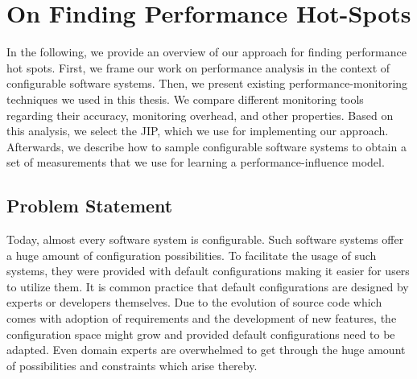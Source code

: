 \chapter{On Finding Performance Hot-Spots}
\label{chap:method}

In the following, we provide an overview of our approach for finding performance hot spots. First, we frame our work on performance analysis in the context of configurable software systems. Then, we present existing performance-monitoring techniques we used in this thesis. We compare different monitoring tools regarding their accuracy, monitoring overhead, and other properties. Based on this analysis, we select the \ac{JIP}, which we use for implementing our approach. Afterwards, we describe how to sample configurable software systems to obtain a set of measurements that we use for learning a performance-influence model.

\section{Problem Statement}



Today, almost every software system is configurable. Such software systems offer a huge amount of configuration possibilities. To facilitate the usage of such systems, they were provided with default configurations making it easier for users to utilize them. It is common practice that default configurations are designed by experts or developers themselves. Due to the evolution of source code which comes with adoption of requirements and the development of new features, the configuration space might grow and provided default configurations need to be adapted. Even domain experts are overwhelmed to get through the huge amount of possibilities and constraints which arise thereby.

